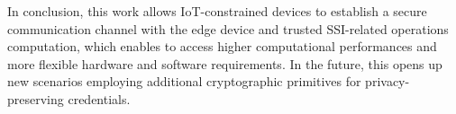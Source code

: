 
In conclusion, this work allows IoT-constrained devices to establish a secure communication channel with the edge device and trusted SSI-related operations computation, which enables to access higher computational performances and more flexible hardware and software requirements. In the future, this opens up new scenarios employing additional cryptographic primitives for privacy-preserving credentials. 


